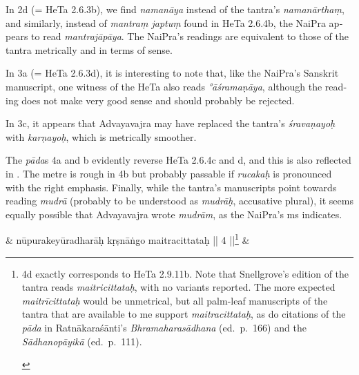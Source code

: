 \documentclass[naipra.tex]{subfiles}
\begin{document}
\begin{sanskrit}
{\begin{english}
		In 2d (= HeTa 2.6.3b), we find \emph{namanāya} instead of the tantra's \emph{namanārthaṃ}, and similarly, instead of \emph{mantraṃ japtuṃ} found in HeTa 2.6.4b, the NaiPra appears to read \emph{mantrajāpāya}.
		The NaiPra's readings are equivalent to those of the tantra metrically and in terms of sense.

		In 3a (= HeTa 2.6.3d), it is interesting to note that, like the NaiPra's Sanskrit manuscript, one witness of the HeTa also reads \emph{°āśramaṇāya}, although the reading does not make very good sense and should probably be rejected.

		In 3c, it appears that Advayavajra may have replaced the tantra's \emph{śravaṇayoḥ} with \emph{karṇayoḥ}, which is metrically smoother.

		The \emph{pāda}s 4a and b evidently reverse HeTa 2.6.4c and d, and this is also reflected in \TIB.
		The metre is rough in 4b but probably passable if \emph{rucakaḥ} is pronounced with the right emphasis.
		Finally, while the tantra's manuscripts point towards reading \emph{mudrā} (probably to be understood as \emph{mudrāḥ}, accusative plural), it seems equally possible that Advayavajra wrote \emph{mudrām}, as the NaiPra's ms indicates.
	\end{english}
} &
nūpurakeyūradharāḥ kṛṣnāṅgo maitracittataḥ || 4 ||\footnote{\begin{english}
	4d exactly corresponds to HeTa 2.9.11b.
	Note that Snellgrove's edition of the tantra reads \emph{maitricittataḥ}, with no variants reported.
	The more expected \emph{maitrīcittataḥ} would be unmetrical, but all palm-leaf manuscripts of the tantra that are available to me support \emph{maitracittataḥ}, as do citations of the \emph{pāda} in Ratnākaraśānti's \emph{Bhramaharasādhana} (ed.\ p.\ 166) and the \emph{Sādhanopāyikā} (ed.\ p.\ 111). 
\end{english}} \&



\end{sanskrit}
\end{document}
